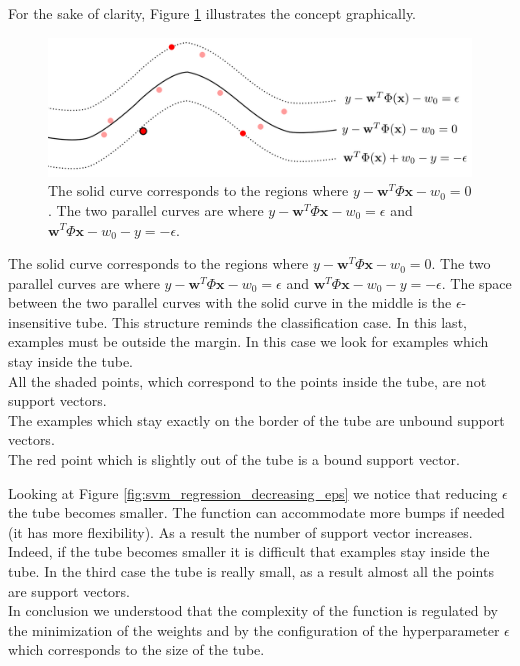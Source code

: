 For the sake of clarity, Figure \ref{fig:svm_regression_graphically} illustrates
the concept graphically.

\begin{figure}[H]
	\centering
	\includegraphics[width=\textwidth]{
		images/14_NonLinearSVMs_regressionGraphically.png
	}
	\caption{The solid curve corresponds to the regions where
	$y - \pmb{w}^{T}\Phi{\pmb{x}}- w_{0}= 0$. The two parallel curves are where $y
	- \pmb{w}^{T}\Phi{\pmb{x}}- w_{0}= \epsilon$ and $\pmb{w}^{T}\Phi{\pmb{x}}- w_{0}
	- y = - \epsilon$.}
	\label{fig:svm_regression_graphically}
\end{figure}

The solid curve corresponds to the regions where $y - \pmb{w}^{T}\Phi{\pmb{x}}- w
_{0}= 0$. The two parallel curves are where
$y - \pmb{w}^{T}\Phi{\pmb{x}}- w_{0}= \epsilon$ and
$\pmb{w}^{T}\Phi{\pmb{x}}- w_{0}- y = - \epsilon$. The space between the two parallel
curves with the solid curve in the middle is the $\epsilon$-insensitive tube.
This structure reminds the classification case. In this last, examples must be
outside the margin. In this case we look for examples which stay inside the tube.\\
All the shaded points, which correspond to the points inside the tube, are not support
vectors. \\ The examples which stay exactly on the border of the tube are
unbound support vectors. \\ The red point which is slightly out of the tube is a
bound support vector.
\newline

Looking at Figure \ref{fig:svm_regression_decreasing_eps} we notice that reducing
$\epsilon$ the tube becomes smaller. The function can accommodate more bumps if
needed (it has more flexibility). As a result the number of support vector increases.
Indeed, if the tube becomes smaller it is difficult that examples stay inside the
tube. In the third case the tube is really small, as a result almost all the points
are support vectors. \\ In conclusion we understood that the complexity of the
function is regulated by the minimization of the weights and by the
configuration of the hyperparameter $\epsilon$ which corresponds to the size of
the tube.
\newline

